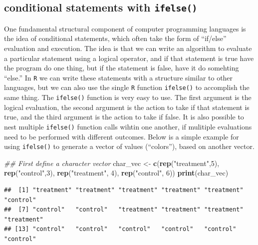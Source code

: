\documentclass[]{book}
\newenvironment{Shaded}{\begin{snugshade}}{\end{snugshade}}
\newcommand{\CommentTok}[1]{\textcolor[rgb]{0.56,0.35,0.01}{\textit{#1}}}
\newcommand{\DecValTok}[1]{\textcolor[rgb]{0.00,0.00,0.81}{#1}}
\newcommand{\KeywordTok}[1]{\textcolor[rgb]{0.13,0.29,0.53}{\textbf{#1}}}
\newcommand{\NormalTok}[1]{#1}
\newcommand{\StringTok}[1]{\textcolor[rgb]{0.31,0.60,0.02}{#1}}
\begin{document}
\hypertarget{conditional-statements-with-ifelse}{%
\subsection{\texorpdfstring{conditional statements with \texttt{ifelse()}}{conditional statements with ifelse()}}\label{conditional-statements-with-ifelse}}

One fundamental structural component of computer programming languages is the idea of conditional statements, which often take the form of ``if/else'' evaluation and execution. The idea is that we can write an algorithm to evaluate a particular statement using a logical operator, and if that statement is true have the program do one thing, but if the statement is false, have it do somehting ``else.'' In \texttt{R} we can write these statements with a structure similar to other languages, but we can also use the single \texttt{R} function \texttt{ifelse()} to accomplish the same thing. The \texttt{ifelse()} function is very easy to use. The first argument is the logical evaluation, the second argument is the action to take if that statement is true, and the third argument is the action to take if false. It is also possible to nest multiple \texttt{ifelse()} function calls wihtin one another, if mulitiple evaluations need to be performed with different outcomes. Below is a simple example for using \texttt{ifelse()} to generate a vector of values (``colors''), based on another vector.

\begin{Shaded}
\begin{Highlighting}[]
\CommentTok{## First define a character vector}
\NormalTok{char_vec <-}\StringTok{ }\KeywordTok{c}\NormalTok{(}\KeywordTok{rep}\NormalTok{(}\StringTok{"treatment"}\NormalTok{,}\DecValTok{5}\NormalTok{), }\KeywordTok{rep}\NormalTok{(}\StringTok{"control"}\NormalTok{,}\DecValTok{3}\NormalTok{), }\KeywordTok{rep}\NormalTok{(}\StringTok{"treatment"}\NormalTok{, }\DecValTok{4}\NormalTok{), }\KeywordTok{rep}\NormalTok{(}\StringTok{"control"}\NormalTok{, }\DecValTok{6}\NormalTok{))}
\KeywordTok{print}\NormalTok{(char_vec)}
\end{Highlighting}
\end{Shaded}

\begin{verbatim}
##  [1] "treatment" "treatment" "treatment" "treatment" "treatment" "control"  
##  [7] "control"   "control"   "treatment" "treatment" "treatment" "treatment"
## [13] "control"   "control"   "control"   "control"   "control"   "control"
\end{verbatim}
\end{document}
